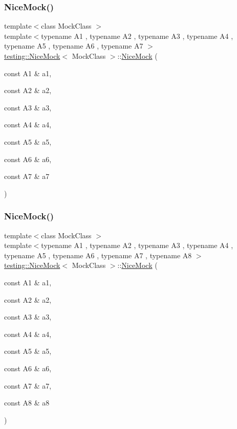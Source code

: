 \subsubsection{\texorpdfstring{NiceMock()}{NiceMock()}\hspace{0.1cm}{\footnotesize\ttfamily [8/11]}}
{\footnotesize\ttfamily template$<$class Mock\+Class $>$ \\
template$<$typename A1 , typename A2 , typename A3 , typename A4 , typename A5 , typename A6 , typename A7 $>$ \\
\mbox{\hyperlink{classtesting_1_1NiceMock}{testing\+::\+Nice\+Mock}}$<$ Mock\+Class $>$\+::\mbox{\hyperlink{classtesting_1_1NiceMock}{Nice\+Mock}} (\begin{DoxyParamCaption}\item[{const A1 \&}]{a1,  }\item[{const A2 \&}]{a2,  }\item[{const A3 \&}]{a3,  }\item[{const A4 \&}]{a4,  }\item[{const A5 \&}]{a5,  }\item[{const A6 \&}]{a6,  }\item[{const A7 \&}]{a7 }\end{DoxyParamCaption})\hspace{0.3cm}{\ttfamily [inline]}}

\mbox{\label{classtesting_1_1NiceMock_ae8792aab6c024a50886856bf1093eedc}} 
\subsubsection{\texorpdfstring{NiceMock()}{NiceMock()}\hspace{0.1cm}{\footnotesize\ttfamily [9/11]}}
{\footnotesize\ttfamily template$<$class Mock\+Class $>$ \\
template$<$typename A1 , typename A2 , typename A3 , typename A4 , typename A5 , typename A6 , typename A7 , typename A8 $>$ \\
\mbox{\hyperlink{classtesting_1_1NiceMock}{testing\+::\+Nice\+Mock}}$<$ Mock\+Class $>$\+::\mbox{\hyperlink{classtesting_1_1NiceMock}{Nice\+Mock}} (\begin{DoxyParamCaption}\item[{const A1 \&}]{a1,  }\item[{const A2 \&}]{a2,  }\item[{const A3 \&}]{a3,  }\item[{const A4 \&}]{a4,  }\item[{const A5 \&}]{a5,  }\item[{const A6 \&}]{a6,  }\item[{const A7 \&}]{a7,  }\item[{const A8 \&}]{a8 }\end{DoxyParamCaption})\hspace{0.3cm}{\ttfamily [inline]}}

